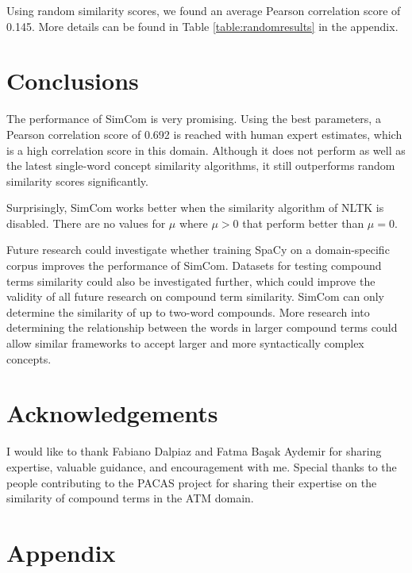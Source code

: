 \documentclass{article}
\begin{document}
Using random similarity scores, we found an average Pearson correlation score of 0.145. More details can be found in Table \ref{table:randomresults} in the appendix.

\section{Conclusions} \label{sec:conclusions}

The performance of SimCom is very promising. Using the best parameters, a Pearson correlation score of 0.692 is reached with human expert estimates, which is a high correlation score in this domain. Although it does not perform as well as the latest single-word concept similarity algorithms, it still outperforms random similarity scores significantly. 

Surprisingly, SimCom works better when the similarity algorithm of NLTK is disabled. There are no values for $\mu$ where $\mu > 0$ that perform better than $\mu = 0$.

Future research could investigate whether training SpaCy on a domain-specific corpus   improves the performance of SimCom. Datasets for testing compound terms similarity could also be investigated further, which could improve the validity of all future research on compound term similarity. SimCom can only determine the similarity of up to two-word compounds. More research into determining the relationship between the words in larger compound terms could allow similar frameworks to accept larger and more syntactically complex concepts.

\section{Acknowledgements} \label{sec:ack}

I would like to thank Fabiano Dalpiaz and Fatma Ba\c{s}ak Aydemir for sharing expertise, valuable guidance, and encouragement with me. Special thanks to the people contributing to the PACAS project for sharing their expertise on the similarity of compound terms in the ATM domain.

\printbibliography

\section{Appendix}
\end{document}

